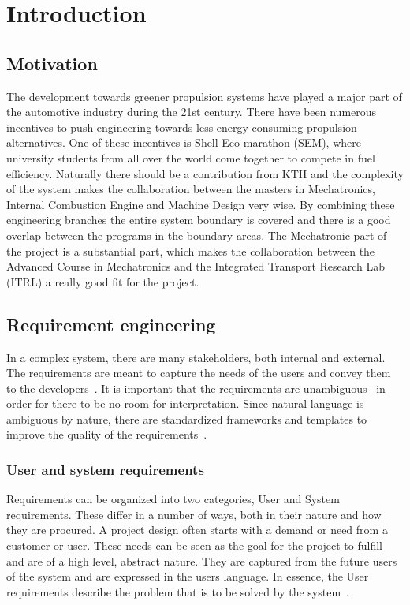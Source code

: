 \chapter{Introduction}
\section{Motivation}
The development towards greener propulsion systems have played a major part of
the automotive industry during the 21st century. There have been numerous
incentives to push engineering towards less energy consuming propulsion
alternatives. One of these incentives is Shell Eco-marathon (SEM), where
university students from all over the world come together to compete in fuel
efficiency. Naturally there should be a contribution from KTH and the complexity
of the system makes the collaboration between the masters in Mechatronics,
Internal Combustion Engine and Machine Design very wise. By combining these
engineering branches the entire system boundary is covered and there is a good
overlap between the programs in the boundary areas. The Mechatronic part of the
project is a substantial part, which makes the collaboration between the
Advanced Course in Mechatronics and the Integrated Transport Research Lab (ITRL)
a really good fit for the project.

\section{Requirement engineering}
In a complex system, there are many stakeholders, both internal and external.
The requirements are meant to capture the needs of the users and convey them to
the developers~\cite{ibm_req}. It is important that the requirements are
unambiguous~\cite{ibm_req, rupp2014} in order for there to be no room for
interpretation. Since natural language is ambiguous by nature, there are
standardized frameworks and templates to improve the quality of the
requirements~\cite{rupp2014}. 

\subsection{User and system requirements}\label{sec:req_usr_sys}
Requirements can be organized into two categories, User and System requirements.
These differ in a number of ways, both in their nature and how they are
procured. A project design often starts with a demand or need from a customer or user.
These needs can be seen as the goal for the project to fulfill and are of a high
level, abstract nature. They are captured from the future users of the system
and are expressed in the users language. In essence, the User requirements
describe the problem that is to be solved by the system~\cite{ibm_req}. 

